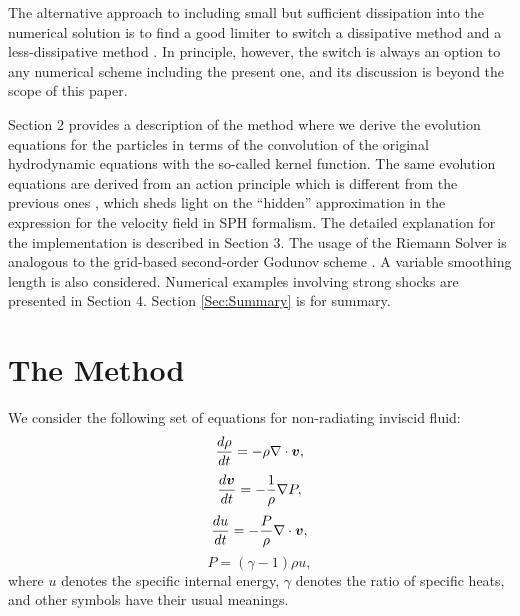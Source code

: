 \documentclass{cjour}
\newcommand{ \Vec   }[1]{ \mbox{\boldmath $ #1 $} }
\begin{document}
\begin{article}
The alternative approach to including small but sufficient 
dissipation into the numerical solution is to find a good 
limiter to switch a dissipative method and a less-dissipative 
method \cite{FulkQuinn:1995,MorrisMonaghan:1997}.  
In principle, however, the switch is always an option to any
numerical scheme including the present one, 
and its discussion is beyond the scope of this paper.

Section 2 provides a description of the method 
where we derive the evolution equations for the particles 
in terms of the convolution of the original hydrodynamic equations 
with the so-called kernel function. 
The same evolution equations are derived from 
an action principle which is different from the previous ones 
\cite{GM:1982, Nelson:1994}, 
which sheds light on the ``hidden'' approximation 
in the expression for the velocity field in SPH formalism.  
The detailed explanation for the implementation is 
described in Section 3.  
The usage of the Riemann Solver is analogous to 
the grid-based second-order Godunov scheme \cite{vL:1979}. 
A variable smoothing length is also considered. 
Numerical examples involving strong shocks are presented in Section 4. 
Section \ref{Sec:Summary} is for summary. 

\section{The Method}
We consider the following set of equations for 
non-radiating inviscid fluid: 
\begin{equation}
                  \frac{ d \rho }{ dt }
                             = - \rho \nabla \cdot \Vec{v} , 
                                                          \label{eq:EoC}
\end{equation}
\begin{equation}
                  \frac{ d \Vec{v} }{ dt } =
                             - \frac{1}{\rho} \nabla P , 
                                                          \label{eq:EoM}
\end{equation}
\begin{equation}
                  \frac{ d u }{ dt } =
                             - \frac{P}{\rho} \nabla \cdot \Vec{v} , 
                                                          \label{eq:EoE}
\end{equation}
\begin{equation}
                  P = ( \gamma - 1 ) \rho u,
                                                          \label{eq:EoS}
\end{equation}
where $u$ denotes the specific internal energy, $\gamma$ denotes 
the ratio of specific heats, and 
other symbols have their usual meanings. 



\end{article}
\end{document}
